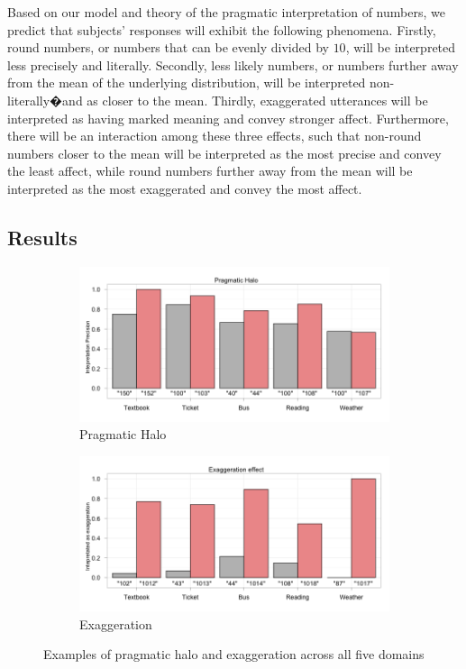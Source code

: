 \documentclass{article} %
\begin{document}
Based on our model and theory of the pragmatic interpretation of numbers, we predict that subjects' responses will exhibit the following phenomena. Firstly, round numbers, or numbers that can be evenly divided by $10$, will be interpreted less precisely and literally. Secondly, less likely numbers, or numbers further away from the mean of the underlying distribution, will be interpreted non-literally�and as closer to the mean. Thirdly, exaggerated utterances will be interpreted as having marked meaning and convey stronger affect. Furthermore, there will be an interaction among these three effects, such that non-round numbers closer to the mean will be interpreted as the most precise and convey the least affect, while round numbers further away from the mean will be interpreted as the most exaggerated and convey the most affect.


\subsection{Results}


\begin{figure}[t]
        \begin{subfigure}[b]{0.5\textwidth}
                \centering
                \caption{Pragmatic Halo}
		\includegraphics[width=\textwidth]{humans_halo.png}
		
	\end{subfigure}
        \begin{subfigure}[b]{0.5\textwidth}
                \centering
                \caption{Exaggeration}
                \includegraphics[width=\textwidth]{humans_exagg.png}
		
	\end{subfigure}
	\caption{Examples of pragmatic halo and exaggeration across all five domains}
\end{figure}
\end{document}
